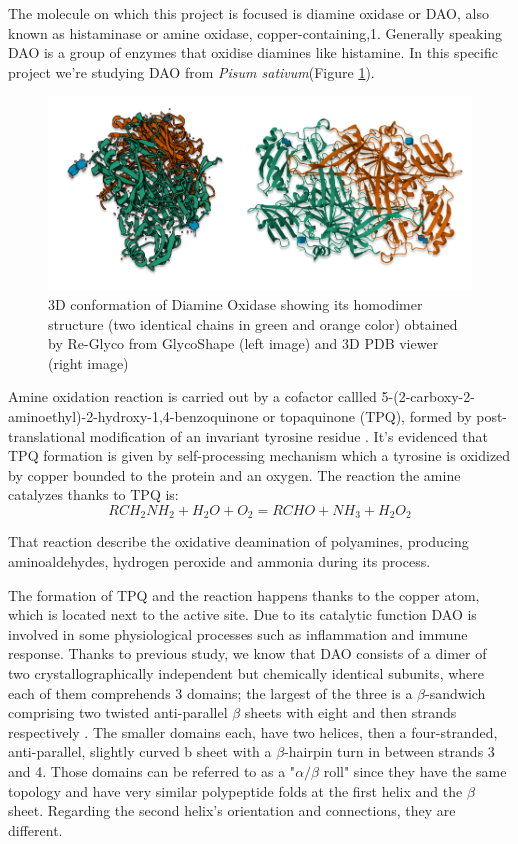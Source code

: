 \documentclass[12pt,twoside]{article}
\begin{document}
The molecule on which this project is focused is diamine oxidase or DAO, also known as histaminase or amine oxidase, copper-containing,1. Generally speaking DAO is a group of enzymes that oxidise diamines like histamine. In this specific project we're studying DAO from \textit{Pisum sativum}(Figure \ref{fig:1KSI}). 

\begin{figure}[tb]
\centering
\includegraphics[width = 1\hsize]{./figures/1KSI}
\caption{3D conformation of Diamine Oxidase showing its homodimer structure (two identical chains in green and orange color) obtained by Re-Glyco from GlycoShape (left image) and 3D PDB viewer (right image)}
\label{fig:1KSI}
\end{figure}

Amine oxidation reaction is carried out by a cofactor callled 5-(2-carboxy-2-aminoethyl)-2-hydroxy-1,4-benzoquinone or topaquinone (TPQ), formed by post-translational modification of an invariant tyrosine residue \cite{Klinman2003}. It's evidenced that TPQ formation is given by self-processing mechanism which a tyrosine is oxidized by copper bounded to the protein and an oxygen. The reaction the amine catalyzes thanks to TPQ is:
\begin{equation}
    RCH_2NH_2 + H_2O + O_2 = RCHO + NH_3 + H_2O_2
\end{equation}

That reaction describe the oxidative deamination of polyamines, producing aminoaldehydes, hydrogen peroxide and ammonia during its process.

The formation of TPQ and the reaction happens thanks to the copper atom, which is located next to the active site. Due to its catalytic function DAO is involved in some physiological processes such as inflammation and immune response.  
Thanks to previous study, we know that DAO consists of a dimer of two crystallographically independent but chemically identical subunits, where each of them comprehends 3 domains; the largest of the three is a $\beta$-sandwich comprising two twisted anti-parallel $\beta$ sheets with eight and then strands respectively \cite{kumar_crystal_1996}. The smaller domains each, have two helices, then a four-stranded, anti-parallel, slightly curved b sheet with a $\beta$-hairpin turn in between strands 3 and 4. Those domains can be referred to as a "$\alpha/\beta$ roll" since they have the same topology and have very similar polypeptide folds at the first helix and the $\beta$ sheet. Regarding the second helix's orientation and connections, they are different.
\end{document}
